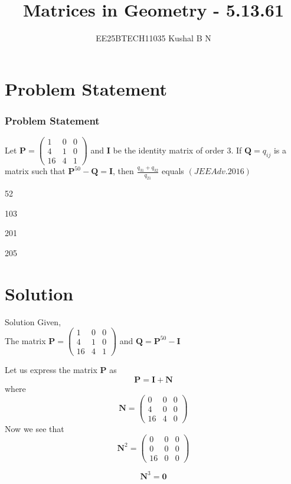 \documentclass{beamer}
\title{Matrices in Geometry - 5.13.61}
\author{EE25BTECH11035  Kushal B N}
\date{}
\let\vec\mathbf
\providecommand{\brak}[1]{\ensuremath{\left(#1\right)}}
\theoremstyle{remark}
\newcommand{\myvec}[1]{\ensuremath{\begin{pmatrix}#1\end{pmatrix}}}
\begin{document}
\maketitle

\section{Problem Statement}
\begin{frame}
\frametitle{Problem Statement}
Let $\vec{P} = \myvec{1&0&0\\4&1&0\\16&4&1}$ and $\vec{I}$ be the identity matrix of order 3. If $\vec{Q} = q_{ij}$ is a matrix such that $\vec{P}^{50} - \vec{Q} = \vec{I}$, then $\frac{q_{31}+q_{32}}{q_{21}}$ equals
\hfill{\brak{JEE Adv. 2016}}
\begin{enumerate}
\begin{multicols}{4}
    \item 52
    \item 103
    \item 201
    \item 205
\end{multicols}
\end{enumerate}

\end{frame}

\section{Solution}
\begin{frame}{Solution}
Given,\\
The matrix $\vec{P} = \myvec{1&0&0\\4&1&0\\16&4&1}$ and $\vec{Q} = \vec{P}^{50} - \vec{I}$

Let us express the matrix $\vec{P}$ as\\
\begin{equation}
    \vec{P} = \vec{I} + \vec{N}
\end{equation}
where 
\begin{equation}
    \vec{N} = \myvec{0&0&0\\4&0&0\\16&4&0}
\end{equation}
Now we see that 
\begin{equation}
    \vec{N}^2 = \myvec{0&0&0\\0&0&0\\16&0&0}
\end{equation}

\begin{equation}
    \vec{N}^3 = \vec{0}
\end{equation}
\end{frame}
\end{document}
